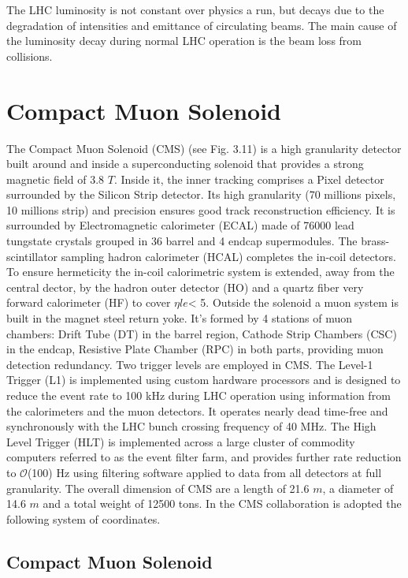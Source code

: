 
The LHC luminosity is not constant over physics a run, but decays due to the
degradation of intensities and emittance of circulating beams. The main cause
of the luminosity decay during normal LHC operation is the beam loss from
collisions.

\section{Compact Muon Solenoid}

The Compact Muon Solenoid (CMS) (see Fig. 3.11) is a high granularity detector
built around and inside a superconducting solenoid that provides a strong
magnetic field of 3.8 $T$. Inside it, the inner tracking comprises a Pixel detector
surrounded by the Silicon Strip detector. Its high granularity (70
millions pixels, 10 millions strip) and precision ensures good track reconstruction
efficiency. It is surrounded by Electromagnetic calorimeter (ECAL) made
of 76000 lead tungstate crystals grouped in 36 barrel and 4 endcap supermodules.
The brass-scintillator sampling hadron calorimeter (HCAL) completes
the in-coil detectors. To ensure hermeticity the in-coil calorimetric system is
extended, away from the central dector, by the hadron outer detector (HO)
and a quartz fiber very forward calorimeter (HF) to cover $\eta le $< 5. Outside the
solenoid a muon system is built in the magnet steel return yoke. It's formed by
4 stations of muon chambers: Drift Tube (DT) in the barrel region, Cathode
Strip Chambers (CSC) in the endcap, Resistive Plate Chamber (RPC) in both
parts, providing muon detection redundancy. Two trigger levels are employed
in CMS. The Level-1 Trigger (L1) is implemented using custom hardware processors
and is designed to reduce the event rate to 100 kHz during LHC operation
using information from the calorimeters and the muon detectors. It operates nearly 
dead time-free and synchronously with the LHC bunch crossing
frequency of 40 MHz. The High Level Trigger (HLT) is implemented across a
large cluster of commodity computers referred to as the event filter farm, and
provides further rate reduction to $\mathcal{O}$(100) Hz using filtering software applied
to data from all detectors at full granularity. The overall dimension of CMS
are a length of 21.6 $m$, a diameter of 14.6 $m$ and a total weight of 12500 tons.
In the CMS collaboration is adopted the following system of coordinates.


\subsection{Compact Muon Solenoid}

